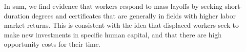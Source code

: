 In sum, we find evidence that workers respond to mass layoffs by seeking short-duration degrees and certificates that are generally in fields with higher labor market returns. This is consistent with the idea that displaced workers seek to make new investments in specific human capital, and that there are high opportunity costs for their time. 